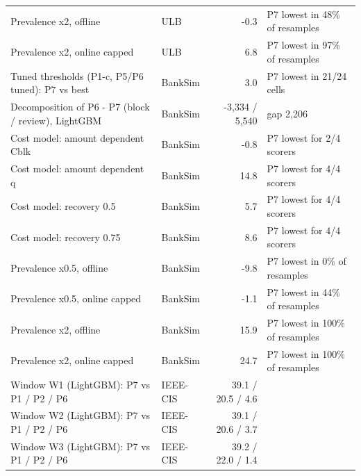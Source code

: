 \begin{table}[t]
\begin{tabular}{llrl}
Prevalence x2, offline & ULB & -0.3 & P7 lowest in 48\% of resamples \\
Prevalence x2, online capped & ULB & 6.8 & P7 lowest in 97\% of resamples \\
Tuned thresholds (P1-c, P5/P6 tuned): P7 vs best & BankSim & 3.0 & P7 lowest in 21/24 cells \\
Decomposition of P6 - P7 (block / review), LightGBM & BankSim & -3,334 / 5,540 & gap 2,206 \\
Cost model: amount dependent Cblk & BankSim & -0.8 & P7 lowest for 2/4 scorers \\
Cost model: amount dependent q & BankSim & 14.8 & P7 lowest for 4/4 scorers \\
Cost model: recovery 0.5 & BankSim & 5.7 & P7 lowest for 4/4 scorers \\
Cost model: recovery 0.75 & BankSim & 8.6 & P7 lowest for 4/4 scorers \\
Prevalence x0.5, offline & BankSim & -9.8 & P7 lowest in 0\% of resamples \\
Prevalence x0.5, online capped & BankSim & -1.1 & P7 lowest in 44\% of resamples \\
Prevalence x2, offline & BankSim & 15.9 & P7 lowest in 100\% of resamples \\
Prevalence x2, online capped & BankSim & 24.7 & P7 lowest in 100\% of resamples \\
Window W1 (LightGBM): P7 vs P1 / P2 / P6 & IEEE-CIS & 39.1 / 20.5 / 4.6 &  \\
Window W2 (LightGBM): P7 vs P1 / P2 / P6 & IEEE-CIS & 39.1 / 20.6 / 3.7 &  \\
Window W3 (LightGBM): P7 vs P1 / P2 / P6 & IEEE-CIS & 39.2 / 22.0 / 1.4 &  \\
\bottomrule
\end{tabular}
\end{table}
